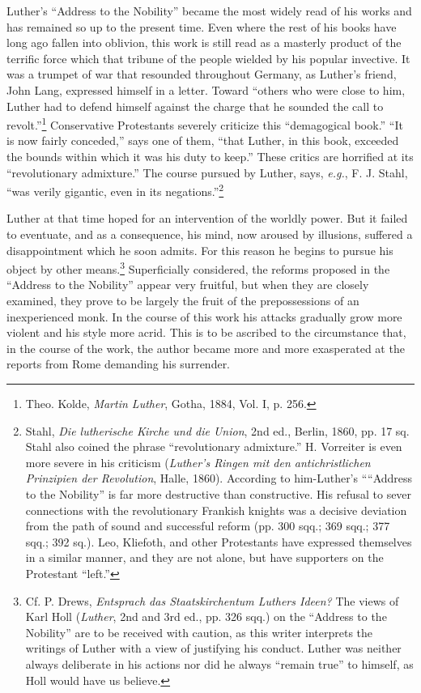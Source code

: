 Luther’s “Address to the Nobility” became the most widely read
of his works and has remained so up to the present time. Even where
the rest of his books have long ago fallen into oblivion, this work is
still read as a masterly product of the terrific force which that tribune
of the people wielded by his popular invective. It was a trumpet of
war that resounded throughout Germany, as Luther’s friend, John
Lang, expressed himself in a letter. Toward “others who were close
to him, Luther had to defend himself against the charge that he
sounded the call to revolt.”\footnote{Theo. Kolde, \textit{Martin Luther}, Gotha, 1884, Vol. I, p. 256.}
Conservative Protestants severely criticize this “demagogical book.” “It
is now fairly conceded,” says one
of them, “that Luther, in this book, exceeded the bounds within
which it was his duty to keep.” These critics are horrified at its “revolutionary
admixture.” The course pursued by Luther, says, \textit{e.g.},
F. J. Stahl, “was verily gigantic, even in its negations.”\footnote
{Stahl, \textit{Die lutherische Kirche und die Union}, 2nd ed., Berlin, 1860, pp. 17 sq. Stahl
also coined the phrase “revolutionary admixture.” H. Vorreiter is even more severe in his
criticism (\textit{Luther’s Ringen mit den antichristlichen Prinzipien der Revolution}, Halle,
1860). According to him-Luther’s ““Address to the Nobility” is far more destructive than
constructive. His refusal to sever connections with the revolutionary Frankish knights
was a decisive deviation from the path of sound and successful reform (pp. 300 sqq.; 369
sqq.; 377 sqq.; 392 sq.). Leo, Kliefoth, and other Protestants have expressed themselves in a
similar manner, and they are not alone, but have supporters on the Protestant “left.”}

Luther at that time hoped for an intervention of the worldly
power. But it failed to eventuate, and as a consequence, his mind,
now aroused by illusions, suffered a disappointment which he soon
admits. For this reason he begins to pursue his object by other means.\footnote
{Cf. P. Drews, \textit{Entsprach das Staatskirchentum Luthers Ideen?} The views of Karl Holl
(\textit{Luther}, 2nd and 3rd ed., pp. 326 sqq.) on the “Address to the Nobility” are to be
received with caution, as this writer interprets the writings of Luther with a view of
justifying his conduct. Luther was neither always deliberate in his actions nor did he
always “remain true” to himself, as Holl would have us believe.}
Superficially considered, the reforms proposed in the “Address to the
Nobility” appear very fruitful, but when they are closely examined,
they prove to be largely the fruit of the prepossessions of an inexperienced
monk. In the course of this work his attacks gradually
grow more violent and his style more acrid. This is to be ascribed
to the circumstance that, in the course of the work, the author became
more and more exasperated at the reports from Rome demanding
his surrender.

